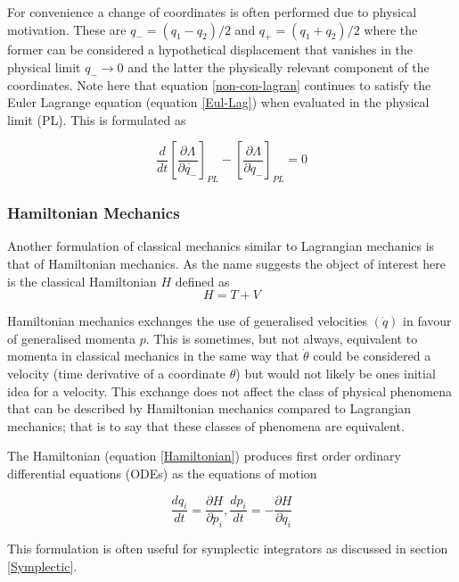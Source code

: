 \documentclass[10pt]{iopart}
\begin{document}
For convenience a change of coordinates is often performed due to physical motivation. These are $q_- = (q_1 - q_2)/2$ and $q_+ = (q_1 + q_2)/2$  where the former can be considered a hypothetical displacement that vanishes in the physical limit $q_- \to 0$ and the latter the physically relevant component of the coordinates.
Note here that equation \ref{non-con-lagran} continues to satisfy the Euler Lagrange equation (equation \ref{Eul-Lag}) when evaluated in the physical limit (PL). This is formulated as

\begin{equation}
\label{NonConEulerLagrange}
	\frac{d}{dt} \left[\frac{\partial \Lambda}{\partial \dot{q_-}}\right]_{PL} - \left[\frac{\partial\Lambda}{\partial q_-}\right]_{PL} = 0
\end{equation}

\subsubsection{Hamiltonian Mechanics \\}
Another formulation of classical mechanics similar to Lagrangian mechanics is that of Hamiltonian mechanics. As the name suggests the object of interest here is the classical Hamiltonian $H$ defined as 
\begin{equation}
\label{Hamiltonian}
	H = T + V
\end{equation}

Hamiltonian mechanics exchanges the use of generalised velocities $(\dot q)$ in favour of generalised momenta $p$. This is sometimes, but not always, equivalent to momenta in classical mechanics in the same way that $\dot\theta$ could be considered a velocity (time derivative of a coordinate $\theta$) but would not likely be ones initial idea for a velocity. This exchange does not affect the class of physical phenomena that can be described by Hamiltonian mechanics compared to Lagrangian mechanics; that is to say that these classes of phenomena are equivalent.

The Hamiltonian (equation \ref{Hamiltonian}) produces first order ordinary differential equations (ODEs) as the equations of motion

\begin{equation}
	\frac{dq_i}{dt} = \frac{\partial H}{\partial p_i}, \frac{dp_i}{dt} = -\frac{\partial H}{\partial q_i}
\end{equation}

This formulation is often useful for symplectic integrators \cite{SanzSerna} as discussed in section \ref{Symplectic}.
\end{document}
